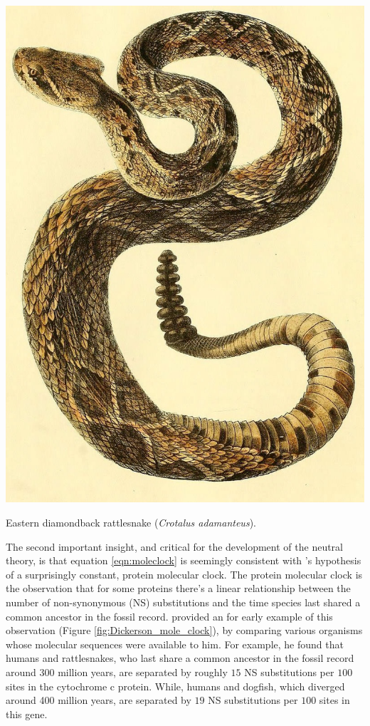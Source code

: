 \begin{marginfigure}[-2cm]
\begin{center}
\includegraphics[width= 0.7 \textwidth]{illustration_images/Genetic_drift/rattlesnake/rattlesnake.jpg}
\end{center}
\caption{Eastern diamondback rattlesnake ({\it Crotalus adamanteus}).  } \label{fig:rattlesnake}
\end{marginfigure}



The second important insight, and critical for the development of the neutral theory, is that equation \eqref{eqn:moleclock} is seemingly consistent with \citet{zuckerkandl1965evolutionary}'s hypothesis of a surprisingly constant, protein molecular clock. The protein molecular clock is the observation that for some proteins there's a linear relationship between the number of non-synonymous (NS) substitutions and the time species last shared a common ancestor in the fossil record. \citet{dickerson1971structure} provided an for early example of this observation (Figure \ref{fig:Dickerson_mole_clock}), by comparing various organisms whose molecular sequences were available to him. For example, he found that humans and rattlesnakes, who last share a common ancestor in the fossil record around 300 million years, are separated by roughly $15$ NS substitutions per $100$ sites in the cytochrome c protein.
While, humans and dogfish, which diverged around 400 million years, are separated by $19$ NS substitutions per $100$ sites in this gene. \\ 


